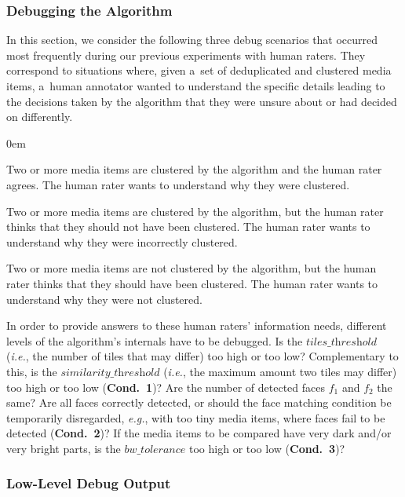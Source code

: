 \subsubsection{Debugging the Algorithm}
\label{sec:debugging-the-algorithm}

In this section, we consider the following three debug scenarios
that occurred most frequently during our previous experiments with human raters.
They correspond to situations where, given a~set of
deduplicated and clustered media items, a~human annotator wanted
to understand the specific details leading to the decisions
taken by the algorithm that they were unsure about or had decided on differently.

\begin{description}
  \itemsep0em
  \item[Clustering Consent.] Two or more media items are clustered
    by the algorithm and the human rater agrees.
    The human rater wants to understand why they were clustered.
  \item[Clustering Dissent.] Two or more media items are clustered
    by the algorithm, but the human rater thinks
    that they should not have been clustered.
    The human rater wants to understand why they were incorrectly clustered.
  \item[Non-Clustering Dissent.] Two or more media items are not clustered
  by the algorithm, but the human rater thinks
  that they should have been clustered.
  The human rater wants to understand why they were not clustered.
\end{description}

In order to provide answers to these human raters' information needs,
different levels of the algorithm's internals have to be debugged.
Is the $\textit{tiles\_threshold}$ (\emph{i.e.},
the number of tiles that may differ) too high or too low?
Complementary to this, is the $\textit{similarity\_threshold}$
(\emph{i.e.}, the maximum amount two tiles may differ)
too high or too low (\textbf{Cond.~1})?
Are the number of detected faces $f_1$ and $f_2$ the same?
Are all faces correctly detected, or should the face matching condition
be temporarily disregarded, \emph{e.g.}, with too tiny media items,
where faces fail to be detected (\textbf{Cond.~2})?
If the media items to be compared have very dark and/or very bright parts,
is the $\textit{bw\_tolerance}$ too high or too low (\textbf{Cond.~3})?

\subsubsection{Low-Level Debug Output}
\label{sec:low-level-debug-output}

